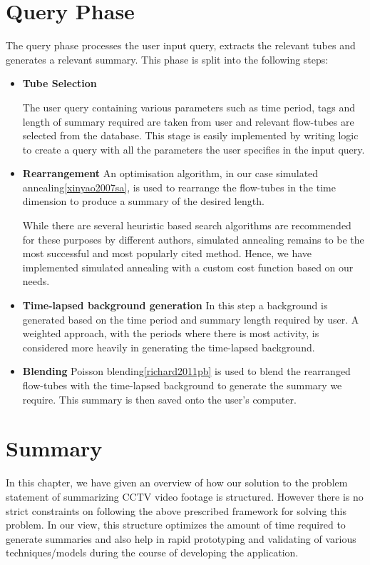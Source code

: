 \section{Query Phase}

The query phase processes the user input query, extracts the relevant tubes and generates a relevant summary. This phase is split into the following steps:

\begin{itemize}

    \item \textbf{Tube Selection}

    The user query containing various parameters such as time period, tags and length of summary required are taken from user and relevant flow-tubes are selected from the database.
    This stage is easily implemented by writing logic to create a query with all the parameters the user specifies in the input query.

    \item \textbf{Rearrangement}
    An optimisation algorithm, in our case simulated annealing\ref{xinyao2007sa}, is used to rearrange the flow-tubes in the time dimension to produce a summary of the desired length.

    While there are several heuristic based search algorithms are recommended for these purposes by different authors, simulated annealing remains to be the most successful and most popularly cited method. Hence, we have implemented simulated annealing with a custom cost function based on our needs.

    \item \textbf{Time-lapsed background generation}
    In this step a background is generated based on the time period and summary length required by user.
    A weighted approach, with the periods where there is most activity, is considered more heavily in generating the time-lapsed background.

    \item \textbf{Blending}
    Poisson blending\ref{richard2011pb} is used to blend the rearranged flow-tubes with the time-lapsed background to generate the summary we require. This summary is then saved onto the user’s computer.
\end{itemize}

\section{Summary}
In this chapter, we have given an overview of how our solution to the problem statement of summarizing CCTV video footage is structured. However there is no strict constraints on following the above prescribed framework for solving this problem. In our view, this structure optimizes the amount of time required to generate summaries and also help in rapid prototyping and validating of various techniques/models during the course of developing the application.